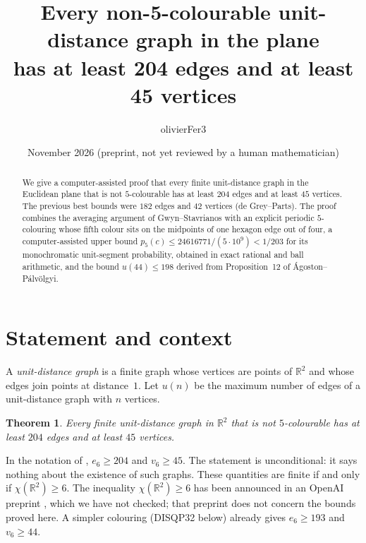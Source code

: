 \documentclass[10pt,a4paper]{article}
\title{Every non-5-colourable unit-distance graph in the plane\\ has at least 204 edges and at least 45 vertices}
\author{olivierFer3}
\date{November 2026 \quad (preprint, not yet reviewed by a human mathematician)}
\newtheorem{theorem}{Theorem}
\newcommand{\R}{\mathbb{R}}
\begin{document}
\maketitle

\begin{abstract}
We give a computer-assisted proof that every finite unit-distance graph in the Euclidean plane that
is not $5$-colourable has at least $204$ edges and at least $45$ vertices. The previous best bounds
were $182$ edges and $42$ vertices (de Grey--Parts). The proof combines the averaging argument of
Gwyn--Stavrianos with an explicit periodic $5$-colouring whose fifth colour sits on the midpoints of
one hexagon edge out of four, a computer-assisted upper bound
$p_5(c)\le 24616771/(5\cdot10^9)<1/203$ for its monochromatic unit-segment probability, obtained in
exact rational and ball arithmetic, and the bound $u(44)\le198$ derived from Proposition~12 of
\'Agoston--P\'alv\"olgyi.
\end{abstract}

\section{Statement and context}

A \emph{unit-distance graph} is a finite graph whose vertices are points of $\R^2$ and whose edges join
points at distance~$1$. Let $u(n)$ be the maximum number of edges of a unit-distance graph with $n$
vertices.

\begin{theorem}\label{thm:main}
Every finite unit-distance graph in $\R^2$ that is not $5$-colourable has at least $204$ edges and
at least $45$ vertices.
\end{theorem}

In the notation of \cite{dGP}, $e_6\ge204$ and $v_6\ge45$. The statement is unconditional: it says
nothing about the existence of such graphs. These quantities are finite if and only if
$\chi(\R^2)\ge6$. The inequality $\chi(\R^2)\ge6$ has been announced in an OpenAI preprint \cite{OAI},
which we have not checked; that preprint does not concern the bounds proved here. A simpler colouring (DISQP32 below) already gives $e_6\ge193$ and $v_6\ge44$.
\end{document}
